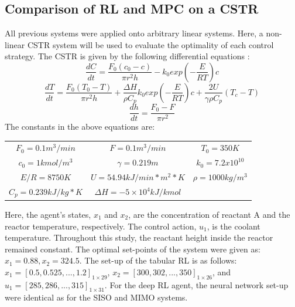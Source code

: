 \subsection{Comparison of RL and MPC on a CSTR}
All previous systems were applied onto arbitrary linear systems. Here, a non-linear CSTR system will be used to evaluate the optimality of each control strategy. The CSTR is given by the following differential equations \cite{chem_eng}:
\begin{equation}
\dfrac{dC}{dt} = \dfrac{F_0(c_0 - c)}{\pi r^2 h} - k_0exp(-\dfrac{E}{RT})c
\end{equation}
\begin{equation}
\dfrac{dT}{dt} = \dfrac{F_0(T_0 - T)}{\pi r^2 h} + \dfrac{\Delta H}{\rho C_p} k_0 exp(-\dfrac{E}{RT})c + \dfrac{2U}{\gamma \rho C_p}(T_c - T)
\end{equation}
\begin{equation}
\dfrac{dh}{dt} = \dfrac{F_0 - F}{\pi r^2 }
\end{equation}
The constants in the above equations are: \\
\begin{table}[H]
\centering
\begin{tabular}{ccc}
$ F_0 = 0.1 m^3 / min$ & $ F = 0.1 m^3 / min $ & $ T_0 = 350 K $ \\ 
$c_0 = 1 kmol/m^3 $ & $\gamma = 0.219 m $	  & $k_0 = 7.2 x 10^{10} $ \\
$ E/R = 8750 K $ & $ U = 54.94 kJ/min*m^2*K $ & $ \rho = 1000 kg/m^3 $ \\
$C_p = 0.239 kJ/kg * K$ & $\Delta H = -5 \times 10^4 kJ/kmol$
\end{tabular}
\end{table}
Here, the agent's states, $x_1$ and $x_2$, are the concentration of reactant A and the reactor temperature, respectively.  The control action, $u_1$, is the coolant temperature. Throughout this study, the reactant height inside the reactor remained constant. The optimal set-points of the system were given as: $x_1 = 0.88, x_2 = 324.5$. The set-up of the tabular RL is as follows: $x_1 = [0.5, 0.525, ..., 1.2]_{1 \times 29}$, $x_2 = [300, 302, ..., 350]_{1 \times 26}$, and $u_1 = [285, 286, ..., 315]_{1 \times 31}$.  For the deep RL agent, the neural network set-up were identical as for the SISO and MIMO systems.

